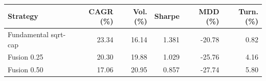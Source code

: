 \begin{tabular}{lrrrrr}
\toprule
Strategy & CAGR (\%) & Vol. (\%) & Sharpe & MDD (\%) & Turn. (\%) \\
\midrule
Fundamental sqrt-cap & 23.34 & 16.14 & 1.381 & -20.78 & 0.82 \\
Fusion 0.25 & 20.30 & 19.88 & 1.029 & -25.76 & 4.16 \\
Fusion 0.50 & 17.06 & 20.95 & 0.857 & -27.74 & 5.80 \\
\bottomrule
\end{tabular}
